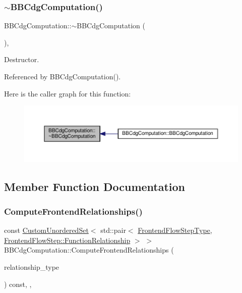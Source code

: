 \subsubsection{\texorpdfstring{$\sim$\+B\+B\+Cdg\+Computation()}{~BBCdgComputation()}}
{\footnotesize\ttfamily B\+B\+Cdg\+Computation\+::$\sim$\+B\+B\+Cdg\+Computation (\begin{DoxyParamCaption}{ }\end{DoxyParamCaption})\hspace{0.3cm}{\ttfamily [override]}, {\ttfamily [default]}}



Destructor. 



Referenced by B\+B\+Cdg\+Computation().

Here is the caller graph for this function\+:
\nopagebreak
\begin{figure}[H]
\begin{center}
\leavevmode
\includegraphics[width=350pt]{d5/d7d/classBBCdgComputation_ad6d4ce89c374dc884d7765d81a40d244_icgraph}
\end{center}
\end{figure}


\subsection{Member Function Documentation}
\mbox{\label{classBBCdgComputation_af0ad1a97db94f07a681729131f821ea9}} 
\subsubsection{\texorpdfstring{Compute\+Frontend\+Relationships()}{ComputeFrontendRelationships()}}
{\footnotesize\ttfamily const \hyperlink{classCustomUnorderedSet}{Custom\+Unordered\+Set}$<$ std\+::pair$<$ \hyperlink{frontend__flow__step_8hpp_afeb3716c693d2b2e4ed3e6d04c3b63bb}{Frontend\+Flow\+Step\+Type}, \hyperlink{classFrontendFlowStep_af7cf30f2023e5b99e637dc2058289ab0}{Frontend\+Flow\+Step\+::\+Function\+Relationship} $>$ $>$ B\+B\+Cdg\+Computation\+::\+Compute\+Frontend\+Relationships (\begin{DoxyParamCaption}\item[{const \hyperlink{classDesignFlowStep_a723a3baf19ff2ceb77bc13e099d0b1b7}{Design\+Flow\+Step\+::\+Relationship\+Type}}]{relationship\+\_\+type }\end{DoxyParamCaption}) const\hspace{0.3cm}{\ttfamily [override]}, {\ttfamily [private]}, {\ttfamily [virtual]}}



